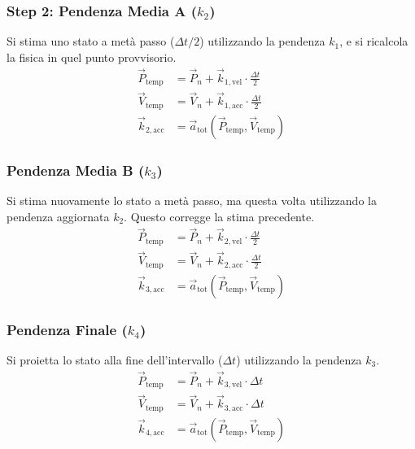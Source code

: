 \documentclass[12pt,a4paper]{article}
\begin{document}
\subsubsection{Step 2: Pendenza Media A ($k_2$)}
Si stima uno stato a metà passo ($\Delta t / 2$) utilizzando la pendenza $k_1$, e si ricalcola la fisica in quel punto provvisorio.
\begin{align}
    \vec{P}_{\text{temp}} &= \vec{P}_n + \vec{k}_{1, \text{vel}} \cdot \frac{\Delta t}{2} \\
    \vec{V}_{\text{temp}} &= \vec{V}_n + \vec{k}_{1, \text{acc}} \cdot \frac{\Delta t}{2} \\
    \vec{k}_{2, \text{acc}} &= \vec{a}_{\text{tot}}(\vec{P}_{\text{temp}}, \vec{V}_{\text{temp}})
\end{align}

\subsubsection{Pendenza Media B ($k_3$)}
Si stima nuovamente lo stato a metà passo, ma questa volta utilizzando la pendenza aggiornata $k_2$. Questo corregge la stima precedente.
\begin{align}
    \vec{P}_{\text{temp}} &= \vec{P}_n + \vec{k}_{2, \text{vel}} \cdot \frac{\Delta t}{2} \\
    \vec{V}_{\text{temp}} &= \vec{V}_n + \vec{k}_{2, \text{acc}} \cdot \frac{\Delta t}{2} \\
    \vec{k}_{3, \text{acc}} &= \vec{a}_{\text{tot}}(\vec{P}_{\text{temp}}, \vec{V}_{\text{temp}})
\end{align}

\subsubsection{Pendenza Finale ($k_4$)}
Si proietta lo stato alla fine dell'intervallo ($\Delta t$) utilizzando la pendenza $k_3$.
\begin{align}
    \vec{P}_{\text{temp}} &= \vec{P}_n + \vec{k}_{3, \text{vel}} \cdot \Delta t \\
    \vec{V}_{\text{temp}} &= \vec{V}_n + \vec{k}_{3, \text{acc}} \cdot \Delta t \\
    \vec{k}_{4, \text{acc}} &= \vec{a}_{\text{tot}}(\vec{P}_{\text{temp}}, \vec{V}_{\text{temp}})
\end{align}



\end{document}
